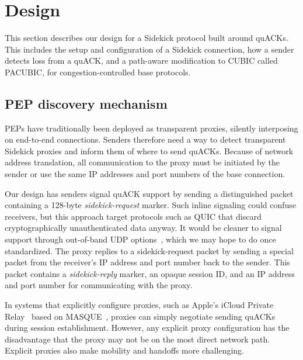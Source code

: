 \section{Design}
\label{sec:sidekick:design}

This section describes our design for a Sidekick protocol built around
quACKs. This includes the setup and configuration of a Sidekick
connection, how a sender detects loss from a quACK, and a path-aware
modification to CUBIC called PACUBIC, for congestion-controlled base
protocols.


\subsection{PEP discovery mechanism}
\label{sec:sidekick:design:discovery}

PEPs have traditionally been deployed as transparent proxies, silently
interposing on end-to-end connections. Senders therefore need a way to detect
transparent Sidekick proxies and inform them of where to send quACKs.  Because
of network address translation, all communication to the proxy must be
initiated by the sender or use the same IP addresses and port numbers of the
base connection.

Our design has senders signal quACK support by sending a
distinguished packet containing a 128-byte \emph{sidekick-request} marker.
Such inline signaling could confuse receivers, but this approach target protocols
such as QUIC that discard cryptographically unauthenticated data anyway.  It
would be cleaner to signal support through out-of-band UDP options~\cite
{ietf-tsvwg-udp-options-28}, which we may hope to do once standardized.
The proxy replies to a sidekick-request packet by sending a special packet from
the receiver's IP address and port number back to the sender. This packet
contains a \emph{sidekick-reply} marker, an opaque session ID, and an IP
address and port number for communicating with the proxy.

In systems that explicitly configure proxies, such as Apple's iCloud Private
Relay~\cite{icloud-private-relay} based on MASQUE~\cite
{kosek2021masque,kramer2021masquepep}, proxies can simply negotiate sending
quACKs during session establishment. However, any explicit proxy configuration
has the disadvantage that the proxy may not be on the most direct network path.
Explicit proxies also make mobility and handoffs more challenging.

